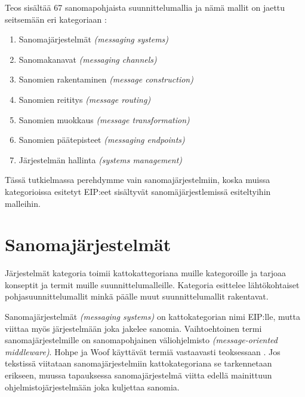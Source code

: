 Teos sisältää 67 sanomapohjaista suunnittelumallia ja nämä mallit on jaettu seitsemään eri kategoriaan \citep{Hohpe2004}:


\begin{enumerate}
   \item Sanomajärjestelmät \textit{(messaging systems)}
   \item Sanomakanavat \textit{(messaging channels)}
   \item Sanomien rakentaminen \textit{(message construction)}
   \item Sanomien reititys \textit{(message routing)}
   \item Sanomien muokkaus \textit{(message transformation)}
   \item Sanomien päätepisteet \textit{(messaging endpoints)}
   \item Järjestelmän hallinta \textit{(systems management)}
\end{enumerate}

Tässä tutkielmassa perehdymme vain sanomajärjestelmiin, koska muissa kategorioissa esitetyt EIP:eet sisältyvät sanomäjärjestlemissä esiteltyihin malleihin.

\section{Sanomajärjestelmät}
Järjestelmät kategoria toimii kattokattegoriana muille kategoroille ja tarjoaa konseptit ja termit muille suunnittelumalleille. 
Kategoria esittelee lähtökohtaiset pohjasuunnittelumallit minkä päälle muut suunnittelumallit rakentavat. 

Sanomajärjestelmät \textit{(messaging systems)} on kattokategorian nimi EIP:lle, mutta viittaa myös järjestelmään joka jakelee sanomia. Vaihtoehtoinen termi sanomajärjestelmille on sanomapohjainen väliohjelmisto \textit{(message-oriented middleware)}. Hohpe ja Woof käyttävät termiä vastaavasti teoksessaan \citep{Hohpe2004}. Jos tekstissä viitataan sanomajärjestelmiin kattokategoriana se tarkennetaan erikseen, muussa tapauksessa sanomajärjestelmä viitta edellä mainittuun ohjelmistojärjestelmään joka kuljettaa sanomia.

